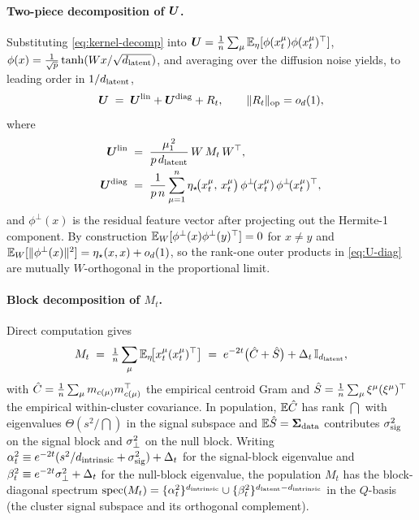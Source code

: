 \paragraph{Two-piece decomposition of $\bm{U}$.}
Substituting \eqref{eq:kernel-decomp} into
$\bm{U} = \tfrac{1}{n}\sum_\mu \mathbb{E}_\eta[\phi(x_t^\mu)\phi(x_t^\mu)^\top]$,
$\phi(x) = \tfrac{1}{\sqrt{p}}\tanh(Wx/\sqrt{d_{\mathrm{latent}}})$, and
averaging over the diffusion noise yields, to leading order in $1/d_{\mathrm{latent}}$,
\begin{equation}
  \bm{U} \;=\; \bm{U}^{\mathrm{lin}} + \bm{U}^{\mathrm{diag}} + R_t,
  \qquad \|R_t\|_{\mathrm{op}} = o_d(1),
  \label{eq:U-split}
\end{equation}
where
\begin{align}
  \bm{U}^{\mathrm{lin}}
    \;&=\; \frac{\mu_1^{\,2}}{p\,d_{\mathrm{latent}}}\,W\,M_t\,W^\top,
    \label{eq:U-lin}\\
  \bm{U}^{\mathrm{diag}}
    \;&=\; \frac{1}{p\,n}\sum_{\mu=1}^{n}
           \eta_\star\!\bigl(x_t^\mu,\,x_t^\mu\bigr)\,
           \phi^{\perp}\!(x_t^\mu)\,\phi^{\perp}\!(x_t^\mu)^\top,
    \label{eq:U-diag}
\end{align}
and $\phi^\perp(x)$ is the residual feature vector after projecting
out the Hermite-1 component. By construction
$\mathbb{E}_W[\phi^\perp(x)\phi^\perp(y)^\top] = 0$ for $x\neq y$ and
$\mathbb{E}_W[\|\phi^\perp(x)\|^2] = \eta_\star(x,x)+o_d(1)$, so the rank-one
outer products in \eqref{eq:U-diag} are mutually $W$-orthogonal in
the proportional limit.

\paragraph{Block decomposition of $M_t$.}
Direct computation gives
\begin{equation}
  M_t \;=\; \tfrac{1}{n}\sum_\mu \mathbb{E}_\eta\!\bigl[x_t^\mu(x_t^\mu)^\top\bigr]
        \;=\; e^{-2t}\bigl(\hat C + \hat S\bigr) + \Delta_t\,\mathbb{I}_{d_{\mathrm{latent}}},
  \label{eq:Mt}
\end{equation}
with $\hat C = \tfrac{1}{n}\sum_\mu m_{c(\mu)}m_{c(\mu)}^\top$ the
empirical centroid Gram and $\hat S = \tfrac{1}{n}\sum_\mu
\xi^\mu(\xi^\mu)^\top$ the empirical within-cluster covariance.
In population, $\mathbb{E}\hat C$ has rank $\dint$ with eigenvalues
$\Theta(s^2/\dint)$ in the signal subspace and $\mathbb{E}\hat S = \bm{\Sigma}_{\mathrm{data}}$
contributes $\sigma_{\mathrm{sig}}^2$ on the signal block and $\sigma_{\perp}^2$ on the
null block. Writing $\alpha_t^2 \equiv e^{-2t}(s^2/d_{\mathrm{intrinsic}} + \sigma_{\mathrm{sig}}^2) + \Delta_t$
for the signal-block eigenvalue and $\beta_t^2 \equiv e^{-2t}\sigma_{\perp}^2 + \Delta_t$
for the null-block eigenvalue, the population $M_t$ has the block-diagonal
spectrum
\(\mathrm{spec}(M_t) = \{\alpha_t^2\}^{d_{\mathrm{intrinsic}}} \cup \{\beta_t^2\}^{d_{\mathrm{latent}}-d_{\mathrm{intrinsic}}}\)
in the $Q$-basis (the cluster signal subspace and its orthogonal
complement).


